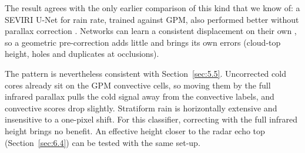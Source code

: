 The result agrees with the only earlier comparison of this kind that we know of: a SEVIRI U-Net for rain rate, trained against GPM, also performed better without parallax correction \citep{dadderio2023}. Networks can learn a consistent displacement on their own \citep{hilburn2021}, so a geometric pre-correction adds little and brings its own errors (cloud-top height, holes and duplicates at occlusions).

The pattern is nevertheless consistent with Section~\ref{sec:5.5}. Uncorrected cold cores already sit on the GPM convective cells, so moving them by the full infrared parallax pulls the cold signal away from the convective labels, and convective scores drop slightly. Stratiform rain is horizontally extensive and insensitive to a one-pixel shift. For this classifier, correcting with the full infrared height brings no benefit. An effective height closer to the radar echo top (Section~\ref{sec:6.4}) can be tested with the same set-up.
